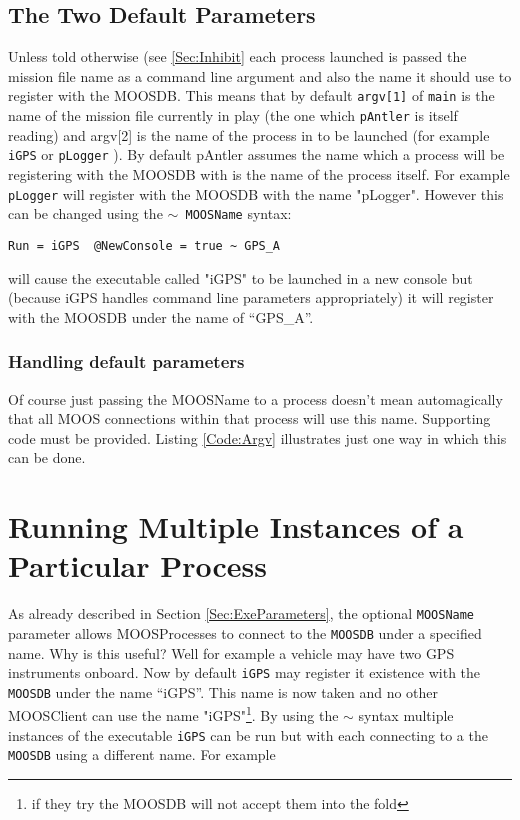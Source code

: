 \documentclass[a4paper,10pt]{article}
\newcommand{\Code}[1]{\texttt{#1} }
\newcommand{\code}[1]{\Code{#1} }
\newcommand{\DB}   {\code{{MOOSDB}}}
\begin{document}
\subsection{The Two Default Parameters}
Unless told otherwise (see \ref{Sec:Inhibit}  each process launched is
passed the mission file name  as a command line argument and also the name it should use to register with the MOOSDB. This means
that by default \code{argv[1]} of \code{main} is the name of the mission file currently in play (the one which \code{pAntler} is itself reading) and argv[2] is the name of the process in to be launched (for example \code{iGPS} or \code{pLogger}). By default pAntler assumes the name which a process will be registering with the MOOSDB with is the name of the process itself. For example \code{pLogger} will register with the MOOSDB with the name "pLogger". However this can be changed using the \code{$\sim$ MOOSName} syntax:

\begin{lstlisting}
Run = iGPS  @NewConsole = true ~ GPS_A
\end{lstlisting}

will cause the executable called "iGPS" to be launched in a new console but (because iGPS handles command line parameters appropriately) it will register with the MOOSDB under the name of ``GPS\_A''. 

\subsubsection{Handling default parameters}
Of course just passing the MOOSName to a process doesn't mean automagically that all MOOS connections within that process will use this name. Supporting code must be provided. Listing \ref{Code:Argv} illustrates just one way in which this can be done.



 


\section{Running Multiple Instances of a Particular Process}

As already described in Section \ref{Sec:ExeParameters}, the optional \code{MOOSName} parameter allows MOOSProcesses to
connect to the \DB under a specified name. Why is this useful? Well for example a vehicle
may have two GPS instruments onboard. Now by default \code{iGPS}
may register it existence with the \DB under the name ``iGPS''. This name is now taken and no other MOOSClient can use the name "iGPS"\footnote{if they try the MOOSDB will not accept them into the fold}. By using the $\sim$ syntax multiple instances of the executable \code{iGPS} can be run but with each connecting to a the \DB using a different name. For example
\end{document}
